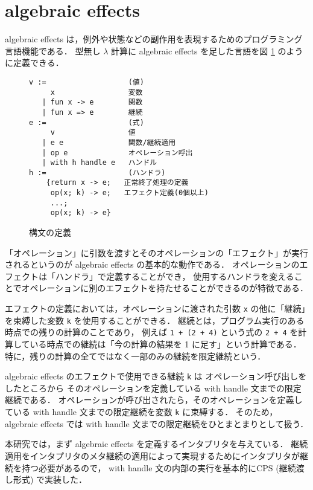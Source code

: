 \section{algebraic effects}
\label{section:algebraic effects}

algebraic effects は，例外や状態などの副作用を表現するためのプログラミング言語機能である．
型無し $\lambda$ 計算に algebraic effects を足した言語を図 \ref{figure:effects} のように定義できる．

\begin{figure}
\begin{verbatim}
v :=                   (値)
     x                 変数
   | fun x -> e        関数
   | fun x => e        継続
e :=                   (式)
     v                 値
   | e e               関数/継続適用
   | op e              オペレーション呼出
   | with h handle e   ハンドル
h :=                   (ハンドラ)
    {return x -> e;   正常終了処理の定義
     op(x; k) -> e;   エフェクト定義(0個以上)
     ...;
     op(x; k) -> e}
\end{verbatim}
\caption{構文の定義}
\label{figure:effects}
\end{figure}

「オペレーション」に引数を渡すとそのオペレーションの「エフェクト」が実行されるというのが algebraic effects の基本的な動作である．
オペレーションのエフェクトは「ハンドラ」で定義することができ，
使用するハンドラを変えることでオペレーションに別のエフェクトを持たせることができるのが特徴である．

エフェクトの定義においては，オペレーションに渡された引数 \texttt{x} の他に「継続」を束縛した変数 \texttt{k} を使用することができる．
継続とは，プログラム実行のある時点での残りの計算のことであり，
例えば \texttt{1 + (2 + 4)} という式の \texttt{2 + 4}
を計算している時点での継続は「今の計算の結果を 1 に足す」という計算である．
特に，残りの計算の全てではなく一部のみの継続を限定継続という．

algebraic effects のエフェクトで使用できる継続 \texttt{k} は
オペレーション呼び出しをしたところから
そのオペレーションを定義している with handle 文までの限定継続である．
オペレーションが呼び出されたら，そのオペレーションを定義している with handle 文までの限定継続を変数 \texttt{k} に束縛する．
そのため，algebraic effects では with handle 文までの限定継続をひとまとまりとして扱う．

本研究では，まず algebraic effects を定義するインタプリタを与えている．
継続適用をインタプリタのメタ継続の適用によって実現するためにインタプリタが継続を持つ必要があるので，
with handle 文の内部の実行を基本的にCPS (継続渡し形式) で実装した．
